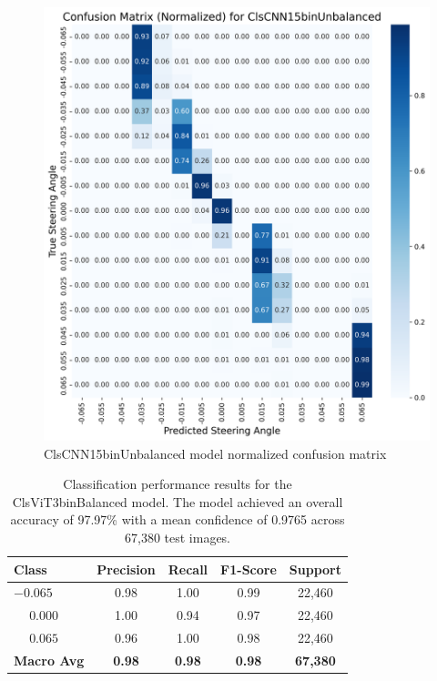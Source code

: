 \begin{figure}[H]
\centering
\includegraphics[width=1\linewidth]{Figures/Results/cm_norm_ClsCNN15binUnbalanced.png}
\caption{ClsCNN15binUnbalanced model normalized confusion matrix}
\label{fig:cm_norm_ClsCNN15binUnbalanced}
\end{figure}


\begin{table}[htbp]
\centering
\begin{tabular}{@{}lcccc@{}}
\toprule
\textbf{Class} & \textbf{Precision} & \textbf{Recall} & \textbf{F1-Score} & \textbf{Support} \\
\midrule
$-0.065$ & 0.98 & 1.00 & 0.99 & 22,460 \\
$\phantom{-}0.000$ & 1.00 & 0.94 & 0.97 & 22,460 \\
$\phantom{-}0.065$ & 0.96 & 1.00 & 0.98 & 22,460 \\
\midrule
\textbf{Macro Avg} & \textbf{0.98} & \textbf{0.98} & \textbf{0.98} & \textbf{67,380} \\
\bottomrule
\end{tabular}
\caption{Classification performance results for the ClsViT3binBalanced model. The model achieved an overall accuracy of 97.97\% with a mean confidence of 0.9765 across 67,380 test images.}
\label{tab:clf_report_ClsViT3binBalanced}
\end{table}


